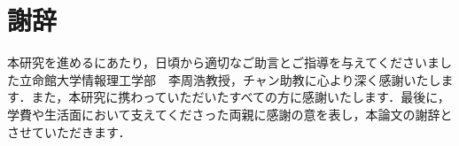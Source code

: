 \documentclass[12pt]{sonota/aislab}
\begin{document}
\chapter*{謝辞}
本研究を進めるにあたり，日頃から適切なご助言とご指導を与えてくださいました立命館大学情報理工学部　李周浩教授，チャン助教に心より深く感謝いたします．また，本研究に携わっていただいたすべての方に感謝いたします．最後に，学費や生活面において支えてくださった両親に感謝の意を表し，本論文の謝辞とさせていただきます．

\end{document}
